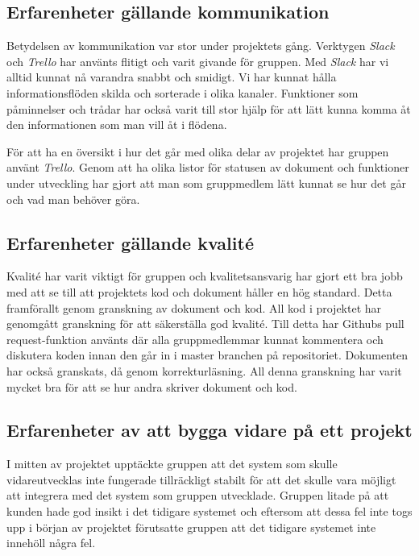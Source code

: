 \subsection{Erfarenheter gällande kommunikation}

Betydelsen av kommunikation var stor under projektets gång. Verktygen \textit{Slack} och \textit{Trello} har använts flitigt och varit givande för gruppen. Med \textit{Slack} har vi alltid kunnat nå varandra snabbt och smidigt. Vi har kunnat hålla informationsflöden skilda och sorterade i olika kanaler. Funktioner som påminnelser och trådar har också varit till stor hjälp för att lätt kunna komma åt den informationen som man vill åt i flödena.

För att ha en översikt i hur det går med olika delar av projektet har gruppen använt \textit{Trello}. Genom att ha olika listor för statusen av dokument och funktioner under utveckling har gjort att man som gruppmedlem lätt kunnat se hur det går och vad man behöver göra.


\subsection{Erfarenheter gällande kvalité}

Kvalité har varit viktigt för gruppen och kvalitetsansvarig har gjort ett bra jobb med att se till att projektets kod och dokument håller en hög standard. Detta framförallt genom granskning av dokument och kod. All kod i projektet har genomgått granskning för att säkerställa god kvalité. Till detta har Githubs pull request-funktion använts där alla gruppmedlemmar kunnat kommentera och diskutera koden innan den går in i master branchen på repositoriet. Dokumenten har också granskats, då genom korrekturläsning. All denna granskning har varit mycket bra för att se hur andra skriver dokument och kod.


\subsection{Erfarenheter av att bygga vidare på ett projekt}

I mitten av projektet upptäckte gruppen att det system som skulle vidareutvecklas inte fungerade tillräckligt stabilt för att det skulle vara möjligt att integrera med det system som gruppen utvecklade. Gruppen litade på att kunden hade god insikt i det tidigare systemet och eftersom att dessa fel inte togs upp i början av projektet förutsatte gruppen att det tidigare systemet inte innehöll några fel.


